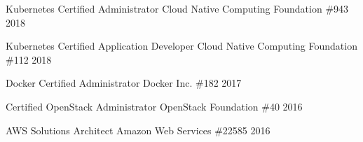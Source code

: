 

\begin{cvhonors}

  \cvhonor
    {Kubernetes Certified Administrator}
    {Cloud Native Computing Foundation}
    {\#943}
    {2018} %

  \cvhonor
    {Kubernetes Certified Application Developer}
    {Cloud Native Computing Foundation}
    {\#112}
    {2018} %

  \cvhonor
    {Docker Certified Administrator}
    {Docker Inc.}
    {\#182}
    {2017} %

  \cvhonor
    {Certified OpenStack Administrator}
    {OpenStack Foundation}
    {\#40}
    {2016} %

  \cvhonor
    {AWS Solutions Architect}
    {Amazon Web Services}
    {\#22585}
    {2016} %


\end{cvhonors}
